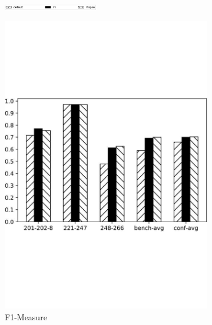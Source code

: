 \documentclass[twoside]{article}
\begin{document}
\begin{figure}[htb!]\centering
\begin{subfigure}{\textwidth}
	\centering
\includegraphics[width=0.45\textwidth]{figures/t_legend.pdf}
\end{subfigure}
\begin{subfigure}{0.3\textwidth}
	\centering
\includegraphics[width=\textwidth]{data_figs/MulRegress_GMap_F1.pdf}
\caption{F1-Measure}
\label{fig:MultiRegress_GMap_F1}
\end{subfigure}
\begin{subfigure}{0.3\textwidth}
	\centering

\end{subfigure}
\end{figure}
\end{document}
